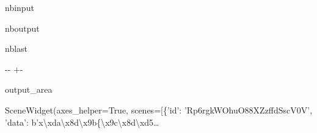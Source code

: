 \documentclass[letterpaper,10pt,english]{sphinxmanual}
\begin{document}
\begin{sphinxuseclass}{nbinput}
{
\begin{sphinxVerbatim}[commandchars=\\\{\}]
\llap{\color{nbsphinxin}[7]:\,\hspace{\fboxrule}\hspace{\fboxsep}} 
              
             
              
\end{sphinxVerbatim}
}

\end{sphinxuseclass}
\begin{sphinxuseclass}{nboutput}
\begin{sphinxuseclass}{nblast}
{

\kern-\sphinxverbatimsmallskipamount\kern-\baselineskip
\kern+\FrameHeightAdjust\kern-\fboxrule
\vspace{\nbsphinxcodecellspacing}

\begin{sphinxuseclass}{output_area}
\begin{sphinxuseclass}{}


\begin{sphinxVerbatim}[commandchars=\\\{\}]
\llap{\color{nbsphinxout}[7]:\,\hspace{\fboxrule}\hspace{\fboxsep}}SceneWidget(axes\_helper=True, scenes=[\{'id': 'Rp6rgkWOhuO88XZzffdSscV0V', 'data': b'x\textbackslash{}xda\textbackslash{}x8d\textbackslash{}x9b\{\textbackslash{}x9c\textbackslash{}x8d\textbackslash{}xd5…
\end{sphinxVerbatim}



\end{sphinxuseclass}
\end{sphinxuseclass}
}

\end{sphinxuseclass}
\end{sphinxuseclass}
\end{document}
